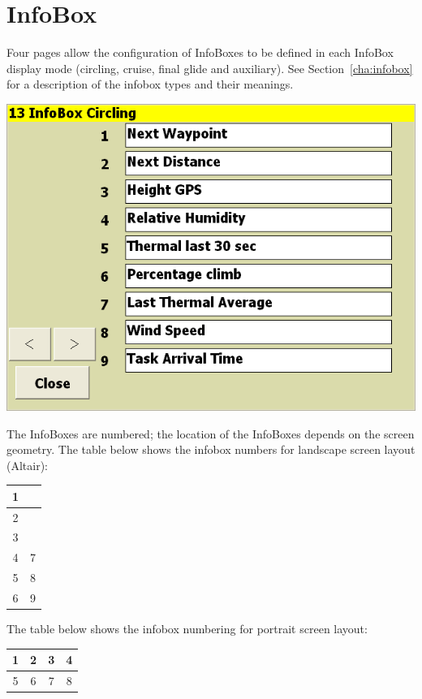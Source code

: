 \documentclass[a4paper,12pt]{refrep}
\newcommand{\InfoBox}[0]{{InfoBox}}
\begin{document}
\clearpage
\section{{\InfoBox}}

Four pages allow the configuration of InfoBoxes to be defined in each
InfoBox display mode (circling, cruise, final glide and auxiliary).  See
Section~\ref{cha:infobox} for a description of the infobox types and
their meanings.

\begin{center}
\includegraphics[angle=0,width=\linewidth,keepaspectratio='true']{figures/config-13.png}
\end{center}

The InfoBoxes are numbered; the location of the InfoBoxes depends on
the screen geometry.  The table below shows the infobox numbers for
landscape screen layout (Altair):

\begin{tabular}{|c|c|}
\hline
1 &  \\
\hline
2 &  \\
\hline
3 &  \\
\hline
4 & 7 \\
\hline
5 & 8 \\
\hline
6 & 9 \\
\hline
\end{tabular}

The table below shows the infobox numbering for portrait screen layout:

\begin{tabular}{|c|c|c|c|}
\hline
1 & 2 & 3 & 4 \\
\hline
\hline
5 & 6 & 7 & 8 \\
\hline
\end{tabular}
\end{document}

